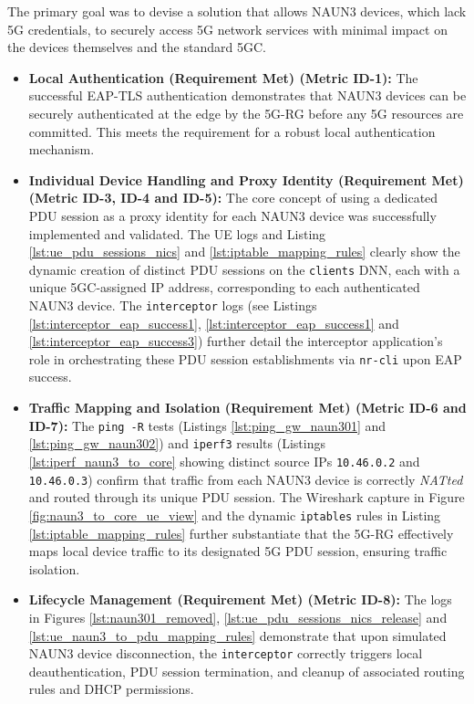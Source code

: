 The primary goal was to devise a solution that allows \ac{NAUN3} devices, which lack \ac{5G} credentials, to securely access \ac{5G} network services with minimal impact on the devices themselves and the standard \ac{5GC}.

\begin{itemize}
    \item \textbf{Local Authentication (Requirement Met) (Metric ID-1):} The successful \ac{EAP-TLS} authentication demonstrates that \ac{NAUN3} devices can be securely authenticated at the edge by the \ac{5G-RG} before any \ac{5G} resources are committed. This meets the requirement for a robust local authentication mechanism.

    \item \textbf{Individual Device Handling and Proxy Identity (Requirement Met) (Metric ID-3, ID-4 and ID-5):} The core concept of using a dedicated \ac{PDU} session as a proxy identity for each \ac{NAUN3} device was successfully implemented and validated. The \ac{UE} logs and Listing \ref{lst:ue_pdu_sessions_nics} and \ref{lst:iptable_mapping_rules} clearly show the dynamic creation of distinct \ac{PDU} sessions on the \texttt{clients} \ac{DNN}, each with a unique \ac{5GC}-assigned \ac{IP} address, corresponding to each authenticated \ac{NAUN3} device. The \texttt{interceptor} logs (see Listings \ref{lst:interceptor_eap_success1}, \ref{lst:interceptor_eap_success1} and \ref{lst:interceptor_eap_success3}) further detail the interceptor application's role in orchestrating these \ac{PDU} session establishments via \texttt{nr-cli} upon \ac{EAP} success.

    \item \textbf{Traffic Mapping and Isolation (Requirement Met) (Metric ID-6 and ID-7):} The \texttt{ping -R} tests (Listings \ref{lst:ping_gw_naun301} and \ref{lst:ping_gw_naun302}) and \texttt{iperf3} results (Listings \ref{lst:iperf_naun3_to_core} showing distinct source \acp{IP} \texttt{10.46.0.2} and \texttt{10.46.0.3}) confirm that traffic from each \ac{NAUN3} device is correctly \textit{NATted} and routed through its unique \ac{PDU} session. The Wireshark capture in Figure \ref{fig:naun3_to_core_ue_view} and the dynamic \texttt{iptables} rules in Listing \ref{lst:iptable_mapping_rules} further substantiate that the \ac{5G-RG} effectively maps local device traffic to its designated \ac{5G} \ac{PDU} session, ensuring traffic isolation.

    \item \textbf{Lifecycle Management (Requirement Met) (Metric ID-8):} The logs in Figures \ref{lst:naun301_removed}, \ref{lst:ue_pdu_sessions_nics_release} and \ref{lst:ue_naun3_to_pdu_mapping_rules} demonstrate that upon simulated \ac{NAUN3} device disconnection, the \texttt{interceptor} correctly triggers local deauthentication, \ac{PDU} session termination, and cleanup of associated routing rules and \ac{DHCP} permissions.


\end{itemize}
